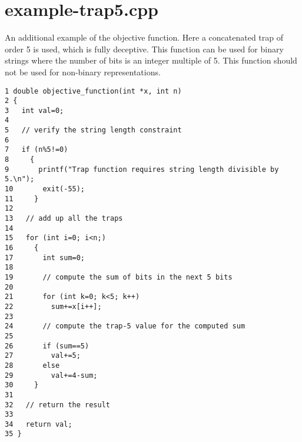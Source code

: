\hypertarget{example-trap5_8cpp-example}{
\section{example-trap5.cpp}
}
An additional example of the objective function. Here a concatenated trap of order 5 is used, which is fully deceptive. This function can be used for binary strings where the number of bits is an integer multiple of 5. This function should not be used for non-binary representations.



\begin{DocInclude}\begin{verbatim}1 double objective_function(int *x, int n)
2 {
3   int val=0;
4 
5   // verify the string length constraint
6 
7   if (n%5!=0)
8     {
9       printf("Trap function requires string length divisible by 5.\n");
10       exit(-55);
11     }
12         
13   // add up all the traps
14 
15   for (int i=0; i<n;)
16     {
17       int sum=0;
18 
19       // compute the sum of bits in the next 5 bits
20 
21       for (int k=0; k<5; k++)
22         sum+=x[i++];
23       
24       // compute the trap-5 value for the computed sum
25 
26       if (sum==5)
27         val+=5;
28       else
29         val+=4-sum;
30     }
31 
32   // return the result
33   
34   return val;
35 }
\end{verbatim}
\end{DocInclude}
 